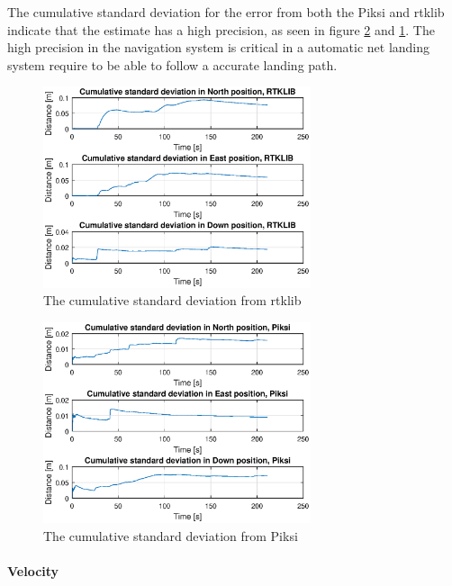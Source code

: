 The cumulative standard deviation for the error from both the Piksi and \gls{rtklib} indicate that the estimate has a high precision, as seen in figure \ref{figure:stdPiksi} and \ref{figure:stdRTK}. The high precision in the navigation system is critical in a automatic net landing system require to be able to follow a accurate landing path.
\begin{figure}[H]
	\centering
		\includegraphics[width=0.7\textwidth]{figs/plots/stdRtklibWalk1.eps}
		\caption{The cumulative standard deviation from \gls{rtklib}}
		\label{figure:stdRTK}
\end{figure}
\begin{figure}[H]
	\centering
		\includegraphics[width=0.7\textwidth]{figs/plots/stdPiksiWalk1.eps}
		\caption{The cumulative standard deviation from Piksi}
		\label{figure:stdPiksi}
\end{figure}
\paragraph{Velocity}

